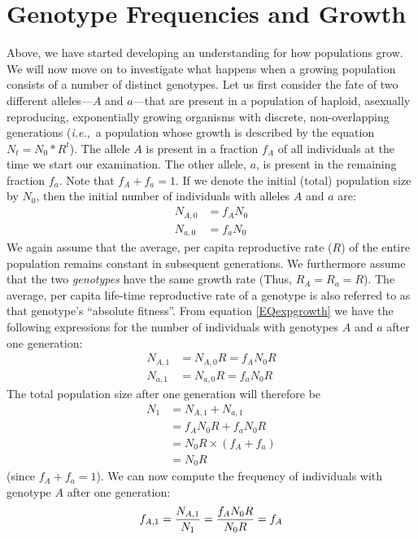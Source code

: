 \documentclass[11pt,a4paper]{book}
\newcommand{\ie}{\emph{i.e.},\ }
\newcommand{\e}{\emph}
\begin{document}
\section{Genotype Frequencies and Growth\label{SECfreqgrowth}}

Above, we have started developing an understanding for how populations grow. We will now move on to investigate what happens when a growing population consists of a number of distinct genotypes.  Let us first consider the fate of two different alleles---$A$ and $a$---that are present in a population of haploid, asexually reproducing, exponentially growing organisms with discrete, non-overlapping generations (\ie a population whose growth is described by the equation $N_t=N_0*R^t$). The allele $A$ is present in a fraction $f_A$ of all individuals at the time we start our examination. The other allele, $a$, is present in the remaining fraction $f_a$. Note that $f_A+f_a=1$. If we denote the initial (total) population size by $N_0$, then the initial number of individuals with alleles $A$ and $a$ are: 
%
\begin{align*}
N_{A,0} &= f_A  N_0\\
N_{a,0} &= f_a N_0
\end{align*}
%
We again assume that the average, per capita reproductive rate ($R$) of the entire population remains constant in subsequent generations. We furthermore assume that the two \e{genotypes} have the same growth rate (Thus, $R_A=R_a=R$). The average, per capita life-time reproductive rate of a genotype is also referred to as that genotype's ``absolute fitness''. From equation \ref{EQexpgrowth} we have the following expressions for the number of individuals with genotypes $A$ and $a$ after one generation:
%
\begin{align*}
N_{A,1} &= N_{A,0} R = f_A  N_0  R\\
N_{a,1} &= N_{a,0} R = f_a N_0 R
\end{align*}
%
The total population size after  one generation will therefore be 
%
\begin{align*}
N_1 &= N_{A,1} + N_{a,1} \\
	&=  f_A  N_0  R + f_a N_0 R\\
	&= N_0 R \times (f_A + f_a)\\
	&= N_0 R
\end{align*}
(since $f_A+f_a=1$). We can now compute the frequency of individuals with genotype $A$ after one generation:
%
\begin{equation*}
f_{A,1} = \frac{N_{A,1}}{N_1} = \frac{f_A N_0 R}{N_0 R} = f_A\\
\end{equation*}
\end{document}
